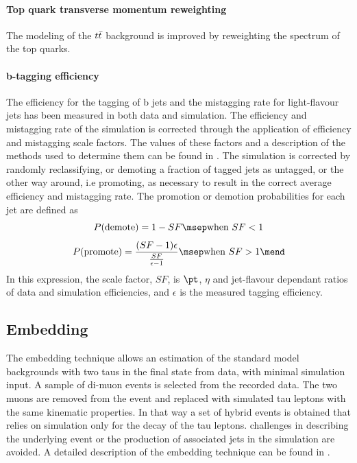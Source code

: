 \paragraph{Top quark transverse momentum reweighting} The modeling of the $t\Bar{t}$ background is improved by reweighting the \pt spectrum of the top quarks.

\paragraph{b-tagging efficiency} The efficiency for the tagging of b jets and the mistagging rate for light-flavour jets has been measured in both data and simulation. The efficiency and mistagging rate of the simulation is corrected through the application of efficiency and mistagging scale factors. The values of these factors and a description of the methods used to determine them can be found in \cite{Sirunyan_2018}. The simulation is corrected by randomly reclassifying, or demoting a fraction of tagged jets as untagged, or the other way around, i.e promoting, as necessary to result in the correct average efficiency and mistagging rate. The promotion or demotion probabilities for each jet are defined as
\begin{equation*}
    P(\mathrm{demote}) = 1 - SF \msep \text{when } SF < 1
\end{equation*}
\begin{equation*}
    P(\mathrm{promote}) = \frac{(SF-1)\epsilon}{\frac{SF}{\epsilon-1}} \msep \text{when } SF > 1 \mend
\end{equation*}
In this expression, the scale factor, $SF$, is $\pt$, $\eta$ and jet-flavour dependant ratios of data and simulation efficiencies, and $\epsilon$ is the measured tagging efficiency.


\subsection{Embedding}
\label{sec:embedding}

The embedding technique allows an estimation of the standard model backgrounds with two taus in the final state from data, with minimal simulation input. A sample of di-muon events is selected from the recorded data. The two muons are removed from the event and replaced with simulated tau leptons with the same kinematic properties. In that way a set of hybrid events is obtained that relies on simulation only for the decay of the tau leptons. challenges in describing the underlying event or the production of associated jets in the simulation are avoided. A detailed description of the embedding technique can be found in \cite{CMS:2018apv}.

